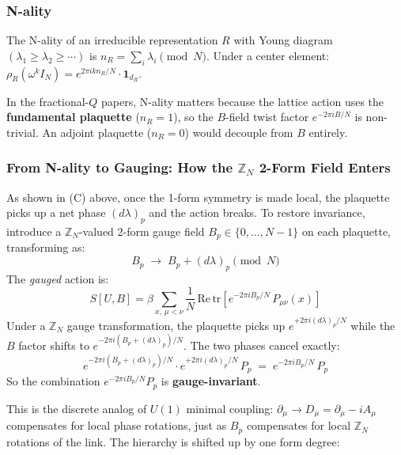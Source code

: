 \documentclass[12pt,a4paper]{article}
\begin{document}
\subsubsection*{N-ality}

The N-ality of an irreducible representation $R$ with Young diagram $(\lambda_1\ge\lambda_2\ge\cdots)$ is
$n_R = \sum_i\lambda_i \pmod{N}$.
Under a center element: $\rho_R(\omega^k I_N) = e^{2\pi ikn_R/N}\cdot\mathbf{1}_{d_R}$.

In the fractional-$Q$ papers, N-ality matters because the lattice action uses the
\textbf{fundamental plaquette} ($n_R=1$), so the $B$-field twist factor
$e^{-2\pi iB/N}$ is non-trivial. An adjoint plaquette ($n_R=0$) would decouple from $B$ entirely.

\subsubsection*{From N-ality to Gauging: How the $\mathbb{Z}_N$ 2-Form Field Enters}

As shown in (C) above, once the 1-form symmetry is made local,
the plaquette picks up a net phase $(d\lambda)_p$ and the action breaks.
To restore invariance, introduce a $\mathbb{Z}_N$-valued 2-form gauge field
$B_p \in \{0,\ldots,N{-}1\}$ on each plaquette, transforming as:
\begin{equation}
  B_p \;\to\; B_p + (d\lambda)_p \pmod{N}
\end{equation}
The \emph{gauged} action is:
\begin{equation}
  S[U,B] = \beta\sum_{x,\,\mu<\nu}\frac{1}{N}\,\mathrm{Re}\,\mathrm{tr}\!\left[
    e^{-2\pi i B_p/N}\,P_{\mu\nu}(x)
  \right]
\end{equation}
Under a $\mathbb{Z}_N$ gauge transformation, the plaquette picks up $e^{+2\pi i(d\lambda)_p/N}$
while the $B$ factor shifts to $e^{-2\pi i(B_p+(d\lambda)_p)/N}$. The two phases cancel exactly:
\begin{equation}
  e^{-2\pi i(B_p + (d\lambda)_p)/N}\cdot e^{+2\pi i(d\lambda)_p/N}\,P_p
  \;=\; e^{-2\pi iB_p/N}\,P_p
\end{equation}
So the combination $e^{-2\pi iB_p/N}P_p$ is \textbf{gauge-invariant}.

This is the discrete analog of $U(1)$ minimal coupling:
$\partial_\mu \to D_\mu = \partial_\mu - iA_\mu$ compensates for local phase rotations,
just as $B_p$ compensates for local $\mathbb{Z}_N$ rotations of the link.
The hierarchy is shifted up by one form degree:
\end{document}
